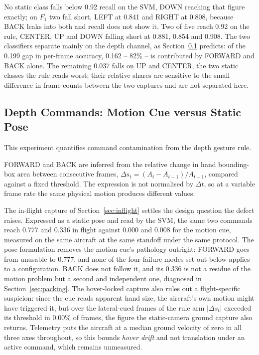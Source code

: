 \documentclass[conference]{IEEEtran}
\begin{document}
No static class falls below 0.92 recall on the SVM, DOWN reaching that figure
exactly; on $F_1$ two fall short, LEFT at 0.841 and RIGHT at 0.808, because
BACK leaks into both and recall does not show it. Two of five reach 0.92 on the
rule, CENTER, UP and DOWN falling short at 0.881, 0.854 and 0.908. The two
classifiers separate mainly on the depth channel, as Section~\ref{sec:depth}
predicts: of the 0.199 gap in per-frame accuracy, 0.162 -- 82\% -- is
contributed by FORWARD and BACK alone. The remaining 0.037 falls on UP and
CENTER, the two static classes the rule reads worst; their relative shares are
sensitive to the small difference in frame counts between the two captures and
are not separated here.

\subsection{Depth Commands: Motion Cue versus Static Pose}
\label{sec:depth}

This experiment quantifies command contamination from the depth gesture
rule.

FORWARD and BACK are inferred from the relative change in hand bounding-box area
between consecutive frames, $\Delta s_t=(A_t-A_{t-1})/A_{t-1}$, compared against
a fixed threshold. The expression is not normalised by $\Delta t$, so at a
variable frame rate the same physical motion produces different values.

The in-flight capture of Section~\ref{sec:inflight} settles the design
question the defect raises. Expressed as a static pose and read by the SVM, the
same two commands reach 0.777 and 0.336 in flight against 0.000 and 0.008 for
the motion cue, measured on the same aircraft at the same standoff under the
same protocol. The pose formulation removes the motion cue's pathology outright:
FORWARD goes from unusable to 0.777, and none of the four failure modes set out
below applies to a configuration. BACK does not follow it, and its 0.336 is not a
residue of the motion problem but a second and independent one, diagnosed in
Section~\ref{sec:packing}. The hover-locked capture also rules out a
flight-specific suspicion: since the cue reads apparent hand size, the
aircraft's own motion might have triggered it, but over the lateral-cued frames
of the rule arm $|\Delta s_t|$ exceeded its threshold in 0.00\% of frames, the
figure the static-camera ground capture also returns. Telemetry puts the
aircraft at a median ground velocity of zero in all three axes throughout, so
this bounds \emph{hover drift} and not translation under an active command,
which remains unmeasured.
\end{document}
